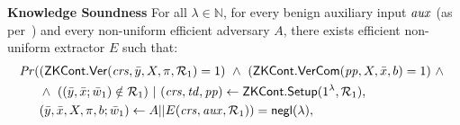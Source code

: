 \begin{definition}[ZK Continuations]
\begin{comment}
\begin{align*}
\mathit{Pr} (& (\ZKCont.\Verify(\crs, \bar{y}, X, \pi, \relone) = 1  = >  \ZKCont.\Verify(\crs, \bar{y}, X', \pi', \relone) = 1)  \ \wedge \  \\
                   & \wedge \ (\ZKCont.\VerifyCom (\pp, X, \barx, b) = 1 => \ZKCont.\VerifyCom (\pp, X', \barx, b') = 1) \ | \\
                   & (\crs, \tw, \pp) \leftarrow \ZKCont.\Setup (1^{\lambda}, \relone), \\ 
                   & (\bary, \barx, X, \pi, b) \leftarrow A(\crs,\pp, \relone) \\
                   & (X', \pi', b') \leftarrow \ZKCont.\Reprove(\crs, X, \pi, b, \relone)) = 1
\end{align*}
\end{comment}

\noindent \textbf{Knowledge Soundness} For all $\lambda \in \mathbb{N}$, for every benign auxiliary input $\mathit{aux}$ (as per~\cite{bening_auxiliary}) and 
every non-uniform efficient adversary $A$, there exists efficient non-uniform extractor $E$ such that:
\begin{align*}
\mathit{Pr} (& ({\mathsf{ZKCont}}.{\mathsf{Ver}}(\mathit{crs}, \bar{y}, X, \pi, \mathcal{R}_1) = 1) \ \wedge \ ({\mathsf{ZKCont}}.{\mathsf{VerCom}}(\mathit{pp}, X, \bar{x}, b) = 1) \ \wedge\ \\
                   & \wedge \ ( (\bar{y}, \bar{x}; \bar{w}_1) \notin \mathcal{R}_1) \ | \ (\mathit{crs}, \mathit{td}, \mathit{pp}) \leftarrow {\ensuremath{\mathsf{ZKCont}}}.{\mathsf{Setup}} (1^{\lambda}, \mathcal{R}_1), \\
                   & (\bar{y}, \bar{x}, X, \pi, b; \bar{w}_1 ) \leftarrow A || E (\mathit{crs}, \mathit{aux}, \mathcal{R}_1)) = \mathsf{negl} (\lambda),
\end{align*}

\begin{comment}
\begin{align*}
\mathit{Pr} (& (\ZKCont.\Verify(\crs, \bar{y}, X, \pi, \relone) = 1) \ \wedge \ (\ZKCont.\VerifyCom(\pp, X, \bar{x}, b) = 1) \ \wedge\ \\
                   & \wedge \ ( (\bary, \barx; \baromega_1) \notin \relone) \ | \ (\crs, \pp) \leftarrow \ZKCont.\Setup (1^{\lambda}), \\
                   & (\bary, \barx, X, \pi, b; \baromega_1 ) \leftarrow A || E (\crs, \realaux, \relone)) = \negl (\lambda),
\end{align*}
\end{comment}


\end{definition}
